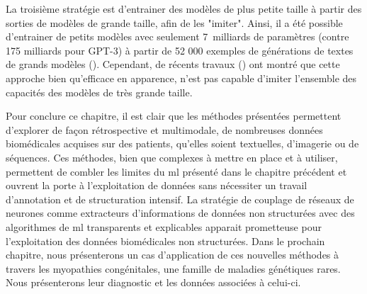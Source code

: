 La troisième stratégie est d'entrainer des modèles de plus petite taille à partir des sorties de modèles de grande taille, afin de les "imiter". Ainsi, il a été possible d'entrainer de petits modèles avec seulement 7~milliards de paramètres (contre 175 milliards pour GPT-3) à partir de 52 000 exemples de générations de textes de grands modèles (\cite{peng_instruction_2023}). Cependant, de récents travaux (\cite{gudibande_false_2023}) ont montré que cette approche bien qu'efficace en apparence, n'est pas capable d'imiter l'ensemble des capacités des modèles de très grande taille.


Pour conclure ce chapitre, il est clair que les méthodes présentées permettent d’explorer de façon rétrospective et multimodale, de nombreuses données biomédicales acquises sur des patients, qu'elles soient textuelles, d'imagerie ou de séquences. Ces méthodes, bien que complexes à mettre en place et à utiliser, permettent de combler les limites du \gls{ml} présenté dans le chapitre précédent et ouvrent la porte à l'exploitation de données sans nécessiter un travail d'annotation et de structuration intensif. La stratégie de couplage de réseaux de neurones comme extracteurs d'informations de données non structurées avec des algorithmes de \gls{ml} transparents et explicables apparait prometteuse pour l'exploitation des données biomédicales non structurées. Dans le prochain chapitre, nous présenterons un cas d'application de ces nouvelles méthodes à travers les myopathies congénitales, une famille de maladies génétiques rares. Nous présenterons leur diagnostic et les données associées à celui-ci.